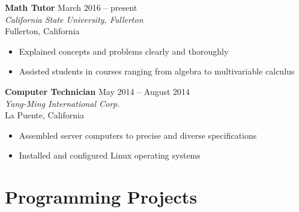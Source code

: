 \documentclass[10pt]{article}
\newcommand{\locheader}[4]{\textbf{#1} \hfill #2 \\ \textit{#3} \\ #4}
\begin{document}
	\locheader{Math Tutor}{March 2016 -- present}{California State University, Fullerton}{Fullerton, California}

	\begin{itemize}[noitemsep]
		\item Explained concepts and problems clearly and thoroughly
		\item Assisted students in courses ranging from algebra to multivariable calculus
	\end{itemize}

	\locheader{Computer Technician}{May 2014 -- August 2014}{Yang-Ming International Corp.}{La Puente, California}

	\begin{itemize}[noitemsep]
		\item Assembled server computers to precise and diverse specifications
		\item Installed and configured Linux operating systems
	\end{itemize}

	\section*{Programming Projects}
\end{document}
